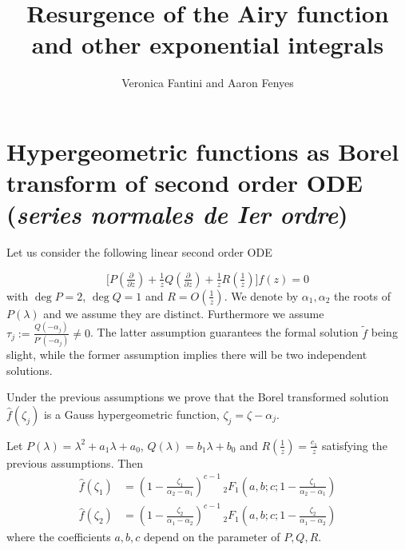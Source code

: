 \documentclass[11pt,a4paper,twoside,leqno,noamsfonts]{amsart}
\title{Resurgence of the Airy function \\ and other exponential integrals}
\author{Veronica Fantini and Aaron Fenyes}
\numberwithin{equation}{section}
\begin{document}
\maketitle
\section{Hypergeometric functions as Borel transform of second order ODE (\textit{series normales de \emph{I}er ordre})}

Let us consider the following linear second order ODE

\begin{equation}\label{eq}
\big[P(\tfrac{\partial}{\partial z})+\tfrac{1}{z}Q(\tfrac{\partial}{\partial z})+\tfrac{1}{z}R(\tfrac{1}{z})\big]f(z)=0
\end{equation}
with $\deg P=2$, $\deg Q=1$ and $R=O(\tfrac{1}{z})$. We denote by $\alpha_1,\alpha_2$ the roots of $P(\lambda)$ and we assume they are distinct. Furthermore we assume $\tau_j:=\frac{Q(-\alpha_j)}{P'(-\alpha_j)}\neq 0$. The latter assumption guarantees the formal solution $\tilde{f}$ being slight, while the former assumption implies there will be two independent solutions. 

Under the previous assumptions we prove that the Borel transformed solution $\hat{f}(\zeta_j)$ is a Gauss hypergeometric function, $\zeta_j=\zeta-\alpha_j$.

\begin{prop}
Let $P(\lambda)=\lambda^2+a_1\lambda+a_0$, $Q(\lambda)=b_1\lambda+b_0$ and $R(\tfrac{1}{z})=\tfrac{c_1}{z}$ satisfying the previous assumptions. Then 
\begin{align}
\hat{f}(\zeta_1)&=\left(1-\frac{\zeta_1}{\alpha_2-\alpha_1}\right)^{c-1} \, {}_2F_1\left(a,b;c;1-\frac{\zeta_1}{\alpha_2-\alpha_1} \right)\\
\hat{f}(\zeta_2)&=\left(1-\frac{\zeta_2}{\alpha_1-\alpha_2}\right)^{c-1} \, {}_2F_1\left(a,b;c;1-\frac{\zeta_2}{\alpha_1-\alpha_2} \right)
\end{align}
where the coefficients $a,b,c$ depend on the parameter of $P,Q,R$. 
\end{prop}
\end{document}
